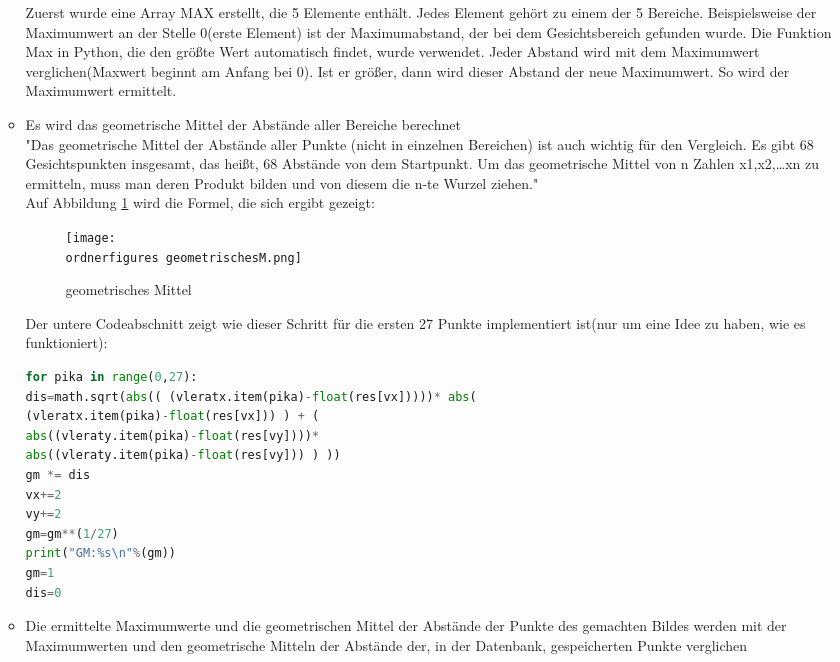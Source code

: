 \begin{enumerate}
\begin{itemize}
	Zuerst wurde eine Array MAX erstellt, die 5 Elemente enthält. Jedes Element gehört zu einem der 5 Bereiche. Beispielsweise der Maximumwert an der Stelle 0(erste Element) ist der Maximumabstand, der bei dem Gesichtsbereich gefunden wurde. Die Funktion Max in Python, die den größte Wert automatisch findet, wurde verwendet. Jeder Abstand wird mit dem Maximumwert verglichen(Maxwert beginnt am Anfang bei 0). Ist er größer, dann wird dieser Abstand der neue Maximumwert. So wird der Maximumwert ermittelt.
	
	\item Es wird das geometrische Mittel der Abstände aller Bereiche berechnet \\
	
	"Das geometrische Mittel der Abstände aller Punkte (nicht in einzelnen Bereichen) ist auch wichtig für den Vergleich. Es gibt 68 Gesichtspunkten insgesamt, das heißt, 68 Abstände von dem Startpunkt. 
	Um das geometrische Mittel von n Zahlen x1,x2,…xn zu ermitteln, muss man deren Produkt bilden und von diesem die n-te Wurzel ziehen."\cite{geometrischesM}\\
	
	Auf Abbildung \ref{fig:geometrischesM} wird die Formel, die sich ergibt gezeigt:
	
	\begin{figure}[H]
		\centering
		\texttt{[image: \\ordnerfigures geometrischesM.png]}
		\caption{geometrisches Mittel}
		\label{fig:geometrischesM}
	\end{figure}

	Der untere Codeabschnitt zeigt wie dieser Schritt für die ersten 27 Punkte implementiert ist(nur um eine Idee zu haben, wie es funktioniert):\\
	
\begin{lstlisting}[language=Python]
for pika in range(0,27):
dis=math.sqrt(abs(( (vleratx.item(pika)-float(res[vx]))))* abs( 
(vleratx.item(pika)-float(res[vx])) ) + ( 
abs((vleraty.item(pika)-float(res[vy])))* 
abs((vleraty.item(pika)-float(res[vy])) ) ))
gm *= dis
vx+=2
vy+=2
gm=gm**(1/27)    
print("GM:%s\n"%(gm))
gm=1
dis=0
\end{lstlisting}
	
	\item Die ermittelte Maximumwerte und die geometrischen Mittel der Abstände der Punkte des gemachten Bildes werden mit der Maximumwerten und den geometrische Mitteln der Abstände der, in der Datenbank, gespeicherten Punkte verglichen \\
	

\end{itemize}
\end{enumerate}
